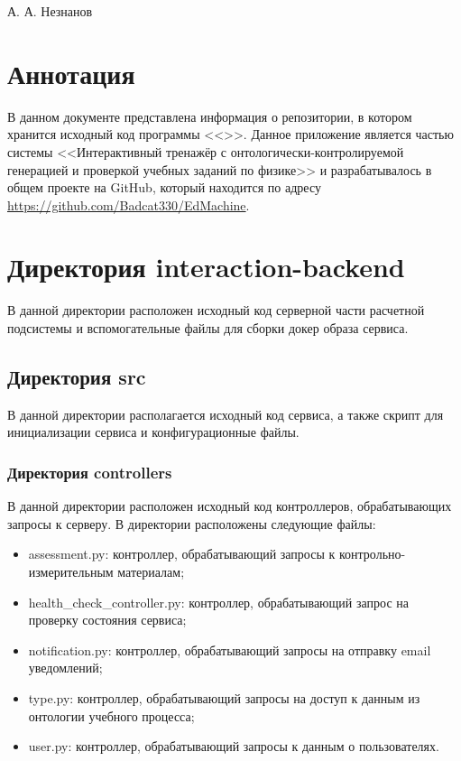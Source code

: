 \documentclass[a4paper,12pt]{article}
\begin{document}



    {А. А. Незнанов}

    \firstPage
    \newpage
    \secondPage
    \newpage
    \thirdPageWithoutTOC
    \section*{Аннотация}

    В данном документе представлена информация о репозитории, в котором хранится исходный код программы <<\unskip>>. Данное приложение является частью системы <<Интерактивный тренажёр с онтологически-контролируемой генерацией и проверкой учебных заданий по физике>> и разрабатывалось в общем проекте на GitHub, который находится по адресу \url{https://github.com/Badcat330/EdMachine}.

    \newpage


    \section{Директория interaction-backend}
    В данной директории расположен исходный код серверной части расчетной подсистемы и вспомогательные файлы для сборки докер образа сервиса.

    \subsection{Директория src}
    В данной директории располагается исходный код сервиса, а также скрипт для инициализации сервиса и конфигурационные файлы.

    \subsubsection{Директория controllers}
    В данной директории расположен исходный код контроллеров, обрабатывающих запросы к серверу. В директории расположены следующие файлы:
    \begin{itemize}
        \item assessment.py: контроллер, обрабатывающий запросы к контрольно-измерительным материалам;
        \item health\_check\_controller.py: контроллер, обрабатывающий запрос на проверку состояния сервиса;
        \item notification.py: контроллер, обрабатывающий запросы на отправку email уведомлений;
        \item type.py: контроллер, обрабатывающий запросы на доступ к данным из онтологии учебного процесса;
        \item user.py: контроллер, обрабатывающий запросы к данным о пользователях.
    \end{itemize}
\end{document}
